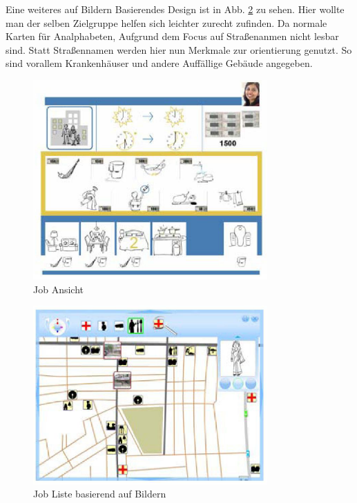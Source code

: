 Eine weiteres auf Bildern Basierendes Design ist in Abb. \ref{fig:mapsimple} zu sehen.
Hier wollte man der selben Zielgruppe helfen sich leichter zurecht zufinden. Da normale Karten für Analphabeten, Aufgrund dem Focus auf Straßenanmen nicht lesbar sind. Statt Straßennamen werden hier nun Merkmale zur orientierung genutzt. So sind vorallem Krankenhäuser und andere Auffällige Gebäude angegeben.
\begin{figure}[h]
	\centering
		\includegraphics[width=0.8\textwidth]{Daten/job_close.PNG}
	\caption{Job Ansicht}
	\label{fig:jobclose}
\end{figure}

\begin{figure}[h]
	\centering
		\includegraphics[width=0.8\textwidth]{Daten/map_simple.PNG}
	\caption{Job Liste basierend auf Bildern}
	\label{fig:mapsimple}
\end{figure}
\clearpage